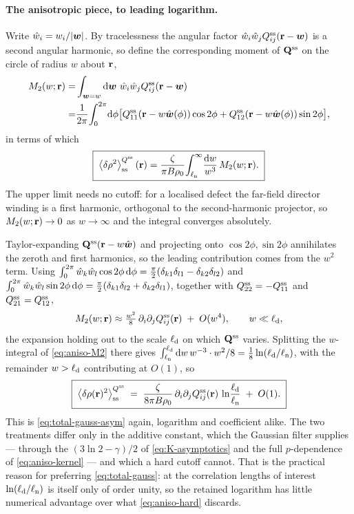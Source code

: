 \documentclass[a5paper]{article}
\begin{document}
\paragraph{The anisotropic piece, to leading logarithm.} Write $\hat w_i = w_i/|\bs w|$. By tracelessness the angular factor $\hat w_i\hat w_j Q^\ss_{ij}(\r-\bs w)$ is a second angular harmonic, so define the corresponding moment of $\Q^\ss$ on the circle of radius $w$ about $\r$,
\begin{align}
    \label{eq:M2-def}
    M_2(w;\r) =&
    \int_{{\bs w}=w}\d {\bs w} ~\hat w_i \hat w_j Q^\ss_{ij}(\r-\bs w)
    \\
    =& \frac{1}{2\pi}\!\int_0^{2\pi}\!\d\phi\bigl[Q^\ss_{11}(\r-w\hat{\bs w}(\phi))\cos 2\phi + Q^\ss_{12}(\r-w\hat{\bs w}(\phi))\sin 2\phi\bigr],
    \nonumber
\end{align}
in terms of which
\begin{equation}
    \label{eq:aniso-M2}
    \boxed{\;\la\delta\rho^2\ra^{Q^\ss}_\ss(\r) = \frac{\zeta}{\pi B\rho_0}\!\int_{\elln}^\infty\!\frac{\d w}{w^3}\,M_2(w;\r).\;}
\end{equation}
The upper limit needs no cutoff: for a localised defect the far-field director winding is a first harmonic, orthogonal to the second-harmonic projector, so $M_2(w;\r)\to0$ as $w\to\infty$ and the integral converges absolutely.

Taylor-expanding $\Q^\ss(\r-w\hat{\bs w})$ and projecting onto $\cos2\phi,\sin2\phi$ annihilates the zeroth and first harmonics, so the leading contribution comes from the $w^2$ term. Using $\int_0^{2\pi}\hat w_k\hat w_l\cos2\phi\,\d\phi = \tfrac{\pi}{2}(\delta_{k1}\delta_{l1}-\delta_{k2}\delta_{l2})$ and $\int_0^{2\pi}\hat w_k\hat w_l\sin2\phi\,\d\phi = \tfrac{\pi}{2}(\delta_{k1}\delta_{l2}+\delta_{k2}\delta_{l1})$, together with $Q^\ss_{22}=-Q^\ss_{11}$ and $Q^\ss_{21}=Q^\ss_{12}$,
\begin{equation}
    \label{eq:M2-taylor}
    M_2(w;\r) \approx \tfrac{w^2}{8}\,\partial_i\partial_j Q^\ss_{ij}(\r) \;+\; O(w^4),\qquad w\ll\elld,
\end{equation}
the expansion holding out to the scale $\elld$ on which $\Q^\ss$ varies. Splitting the $w$-integral of \eqref{eq:aniso-M2} there gives $\int_{\elln}^{\elld}\d w\,w^{-3}\cdot w^2/8 = \tfrac18\ln(\elld/\elln)$, with the remainder $w>\elld$ contributing at $O(1)$, so
\begin{equation}
    \label{eq:aniso-hard}
    \boxed{\;\la\delta\rho(\r)^2\ra^{Q^\ss}_\ss \;=\; \frac{\zeta}{8\pi B\rho_0}\,\partial_i\partial_j Q^\ss_{ij}(\r)\,\ln\!\frac{\elld}{\elln} \;+\; O(1).\;}
\end{equation}
This is \eqref{eq:total-gauss-asym} again, logarithm and coefficient alike. The two treatments differ only in the additive constant, which the Gaussian filter supplies --- through the $(3\ln2-\gamma)/2$ of \eqref{eq:K-asymptotics} and the full $p$-dependence of \eqref{eq:aniso-kernel} --- and which a hard cutoff cannot. That is the practical reason for preferring \eqref{eq:total-gauss}: at the correlation lengths of interest $\ln(\elld/\elln)$ is itself only of order unity, so the retained logarithm has little numerical advantage over what \eqref{eq:aniso-hard} discards.
\end{document}
